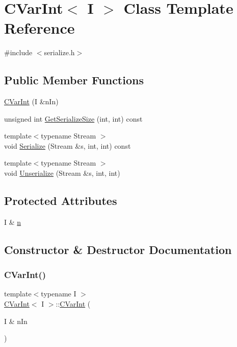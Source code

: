 \hypertarget{class_c_var_int}{}\section{C\+Var\+Int$<$ I $>$ Class Template Reference}
\label{class_c_var_int}


{\ttfamily \#include $<$serialize.\+h$>$}

\subsection*{Public Member Functions}
\begin{DoxyCompactItemize}
\item 
\mbox{\hyperlink{class_c_var_int_ab26b9de1b43d4b9ce844eaa7cf6a6b4f}{C\+Var\+Int}} (I \&n\+In)
\item 
unsigned int \mbox{\hyperlink{class_c_var_int_af994978b1b95a6b5d3009f5743ca6053}{Get\+Serialize\+Size}} (int, int) const
\item 
{\footnotesize template$<$typename Stream $>$ }\\void \mbox{\hyperlink{class_c_var_int_a3b772eba5c6cd5b9ad7cec9cb45f7cb2}{Serialize}} (Stream \&s, int, int) const
\item 
{\footnotesize template$<$typename Stream $>$ }\\void \mbox{\hyperlink{class_c_var_int_aba87b78443378273b4f335dcd858c29c}{Unserialize}} (Stream \&s, int, int)
\end{DoxyCompactItemize}
\subsection*{Protected Attributes}
\begin{DoxyCompactItemize}
\item 
I \& \mbox{\hyperlink{class_c_var_int_a4514adc82b41754d9ac22ee627744614}{n}}
\end{DoxyCompactItemize}


\subsection{Constructor \& Destructor Documentation}
\mbox{\label{class_c_var_int_ab26b9de1b43d4b9ce844eaa7cf6a6b4f}} 
\subsubsection{\texorpdfstring{C\+Var\+Int()}{CVarInt()}}
{\footnotesize\ttfamily template$<$typename I $>$ \\
\mbox{\hyperlink{class_c_var_int}{C\+Var\+Int}}$<$ I $>$\+::\mbox{\hyperlink{class_c_var_int}{C\+Var\+Int}} (\begin{DoxyParamCaption}\item[{I \&}]{n\+In }\end{DoxyParamCaption})\hspace{0.3cm}{\ttfamily [inline]}}



